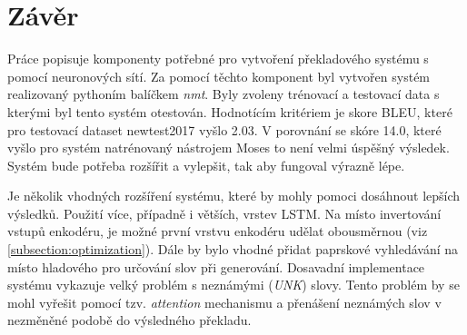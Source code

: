 
\chapter{Závěr}
Práce popisuje komponenty potřebné pro vytvoření překladového systému s pomocí neuronových sítí. Za pomocí těchto komponent byl vytvořen systém realizovaný pythoním balíčkem \emph{nmt}. Byly zvoleny trénovací a testovací data s kterými byl tento systém otestován. Hodnotícím kritériem je skore BLEU, které pro testovací dataset newtest2017 vyšlo 2.03. V porovnání se skóre 14.0, které vyšlo pro systém natrénovaný nástrojem Moses to není velmi úspěšný výsledek. Systém bude potřeba rozšířit a vylepšit, tak aby fungoval výrazně lépe.

Je několik vhodných rozšíření systému, které by mohly pomoci dosáhnout lepších výsledků. Použití více, případně i větších, vrstev LSTM. Na místo invertování vstupů enkodéru, je možné první vrstvu enkodéru udělat obousměrnou (viz \ref{subsection:optimization}). Dále by bylo vhodné přidat paprskové vyhledávání na místo hladového pro určování slov při generování. Dosavadní implementace systému vykazuje velký problém s neznámými (\emph{UNK}) slovy. Tento problém by se mohl vyřešit pomocí tzv. \emph{attention} mechanismu a přenášení neznámých slov v nezměněné podobě do výsledného překladu.


